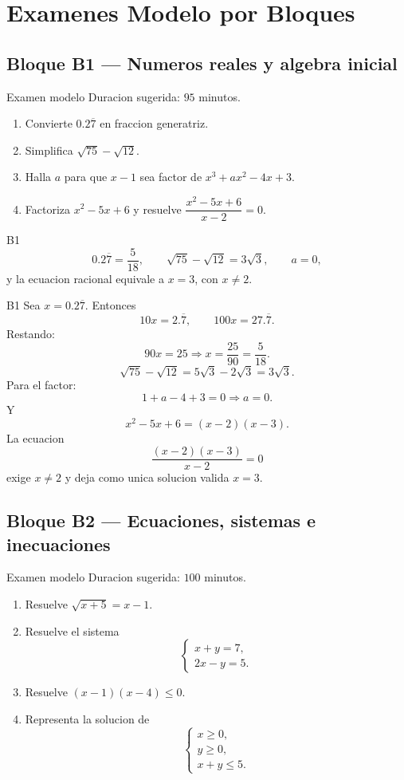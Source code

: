 \chapter{Examenes Modelo por Bloques}

\section{Bloque B1 --- Numeros reales y algebra inicial}

\begin{exambrief}{Examen modelo}
Duracion sugerida: \(95\) minutos.
\begin{enumerate}
  \item Convierte \(0.2\overline{7}\) en fraccion generatriz.
  \item Simplifica \(\sqrt{75}-\sqrt{12}\).
  \item Halla \(a\) para que \(x-1\) sea factor de \(x^3+ax^2-4x+3\).
  \item Factoriza \(x^2-5x+6\) y resuelve \(\dfrac{x^2-5x+6}{x-2}=0\).
\end{enumerate}
\end{exambrief}

\begin{shortanswer}{B1}
\[
0.2\overline{7}=\frac{5}{18},\qquad
\sqrt{75}-\sqrt{12}=3\sqrt{3},\qquad
a=0,
\]
y la ecuacion racional equivale a \(x=3\), con \(x\neq 2\).
\end{shortanswer}

\begin{fullsolution}{B1}
Sea \(x=0.2\overline{7}\). Entonces
\[
10x=2.\overline{7},\qquad 100x=27.\overline{7}.
\]
Restando:
\[
90x=25 \Longrightarrow x=\frac{25}{90}=\frac{5}{18}.
\]
\[
\sqrt{75}-\sqrt{12}=5\sqrt{3}-2\sqrt{3}=3\sqrt{3}.
\]
Para el factor:
\[
1+a-4+3=0 \Longrightarrow a=0.
\]
Y
\[
x^2-5x+6=(x-2)(x-3).
\]
La ecuacion
\[
\frac{(x-2)(x-3)}{x-2}=0
\]
exige \(x\neq 2\) y deja como unica solucion valida \(x=3\).
\end{fullsolution}

\section{Bloque B2 --- Ecuaciones, sistemas e inecuaciones}

\begin{exambrief}{Examen modelo}
Duracion sugerida: \(100\) minutos.
\begin{enumerate}
  \item Resuelve \(\sqrt{x+5}=x-1\).
  \item Resuelve el sistema
  \[
  \begin{cases}
  x+y=7,\\
  2x-y=5.
  \end{cases}
  \]
  \item Resuelve \((x-1)(x-4)\leq 0\).
  \item Representa la solucion de
  \[
  \begin{cases}
  x\geq 0,\\
  y\geq 0,\\
  x+y\leq 5.
  \end{cases}
  \]
\end{enumerate}
\end{exambrief}

